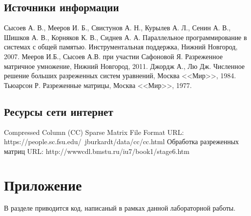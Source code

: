 \documentclass[12pt]{report}
\begin{document}
\newpage

\begin{thebibliography}{1}
\subsection*{Источники информации}
Сысоев А. В., Мееров И. Б., Свистунов А. Н., Курылев А. Л., Сенин А. В., Шишков А. В., Корняков К. В.,
Сиднев А. А. Параллельное программирование в системах с общей
памятью. Инструментальная поддержка, Нижний Новгород, 2007.
Мееров И.Б., Сысоев А.В. при участии Сафоновой Я. Разреженное матричное умножение, Нижний Новгород, 2011.
Джордж А., Лю Дж. Численное решение больших разреженных систем
уравнений, Москва <<Мир>>, 1984.
Тьюарсон Р. Разреженные матрицы, Москва <<Мир>>, 1977.
\subsection*{Ресурсы сети интернет}
Compressed Column (CC) Sparse Matrix File Format URL: https://people.sc.fsu.edu/~jburkardt/data/cc/cc.html
Обработка разреженных матриц URL: \text{ }
http://wwwcdl.bmstu.ru/iu7/book1/stage6.htm
\end{thebibliography}

\newpage

\section*{Приложение}
В разделе приводится код, написаный в рамках данной лабораторной работы.
\end{document}
